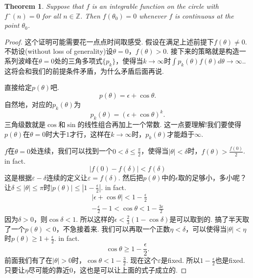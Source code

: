 \documentclass{article}
\newtheorem{theorem}{Theorem}[section]
\begin{document}
\begin{theorem}
Suppose that $f$ is an integrable function on the circle with
$fˆ(n)=0$ for all $n \in \mathbb{Z}$. Then $f(θ_0)= 0$ whenever $f$ is continuous at the point $θ_0$.
\end{theorem}

\begin{proof}
这个证明可能需要花一点点时间取感受. 假设在满足上述前提下$f(\theta) \neq 0$. 不妨设(without loss of generality)设$\theta = 0$，$f(\theta) > 0$. 接下来的策略就是构造一系列波峰在$\theta=0$处的三角多项式$\{p_k\}$，使得当$k \rightarrow \infty$时$\int p_k(\theta)f(\theta)d\theta \rightarrow \infty.$. 这将会和我们的前提条件矛盾，为什么矛盾后面再说.

直接给定$p(\theta)$吧.
$$
	p(\theta) = \epsilon + \cos \theta.
$$
自然地，对应的$p_k(\theta)$为
$$
	p_k(\theta) = (\epsilon + \cos \theta)^k.
$$
三角级数就是$\cos$和$\sin$的线性组合再加上一个常数. 这一点要理解!我们要使得$p(\theta)$在$\theta=0$时大于$1$才行，这样在$k \rightarrow \infty$时，$p_k(\theta)$才能趋于$\infty$.

$f$在$\theta=0$处连续，我们可以找到一个$0 < \delta \leq \frac{\pi}{2}$，使得当$|\theta| < \delta$时，$f(\theta) > \frac{f(0)}{2}$. in fact.
$$
  |f(0)-f(\delta)| < f(\delta) 
$$
这是根据$\varepsilon-\delta$连续的定义让$\varepsilon = f(\delta)$. 然后把$p(\theta)$中的$\epsilon$取的足够小，多小呢？让$\delta \leq |\theta| \leq \pi$时$|p(\theta)| \leq |1-\frac{\epsilon}{2}|$. in fact.
$$
\begin{aligned}
|\epsilon + \cos \theta| < 1-\frac{\epsilon}{2} \\
-\frac{\epsilon}{2} - 1<\cos \theta < 1 - \frac{3\epsilon}{2}
\end{aligned}
$$
因为$\delta > 0$，则$\cos \delta < 1$. 所以这样的$\epsilon <\frac23 (1-\cos \delta)$是可以取到的. 搞了半天取了一个$p(\theta)<0$，不急接着来. 我们可以再取一个正数$\eta < \delta$，可以使得当$|\theta| < \eta$时$p(\theta) \geq 1 + \frac{\epsilon}{2}$. in fact.
$$
\cos \theta \geq 1 - \frac{\epsilon}{2}.
$$
前面我们有了在$|\theta| > 0$时，$\cos \theta < 1 - \frac{3}{2}$. 现在这个$\varepsilon$是fixed. 所以$1-\frac{\epsilon}{2}$也是fixed. 只要让$\eta$尽可能的靠近$0$，这也是可以让上面的式子成立的.


\end{proof}
\end{document}
